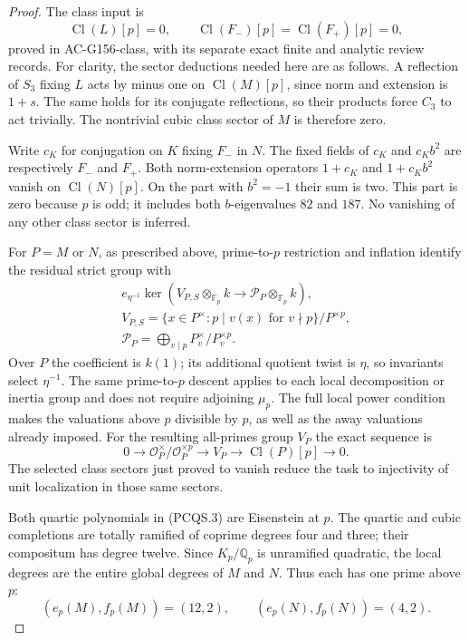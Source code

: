 \begin{proof}
The class input is
\[
 \operatorname{Cl}(L)[p]=0,\qquad
 \operatorname{Cl}(F_-)[p]=\operatorname{Cl}(F_+)[p]=0,
 \tag{PCQS.7}
\]
proved in AC-G156-class, with its separate exact finite and
analytic review records.
For clarity, the sector deductions needed here are as follows.
A reflection of $S_3$ fixing $L$ acts by minus one on
$\operatorname{Cl}(M)[p]$, since norm and extension is $1+s$.
The same holds for its conjugate reflections, so their products
force $C_3$ to act trivially.  The nontrivial cubic class sector
of $M$ is therefore zero.

Write $c_K$ for conjugation on $K$ fixing $F_-$ in $N$.
The fixed fields of $c_K$ and $c_Kb^2$ are respectively
$F_-$ and $F_+$.
Both norm-extension operators $1+c_K$ and $1+c_Kb^2$
vanish on $\operatorname{Cl}(N)[p]$.
On the part with $b^2=-1$ their sum is two.
This part is zero because $p$ is odd; it includes both
$b$-eigenvalues $82$ and $187$.
No vanishing of any other class sector is inferred.

For $P=M$ or $N$, as prescribed above, prime-to-$p$ restriction
and inflation identify the residual strict group with
\[
 \begin{gathered}
 e_{\eta^{-1}}\ker\left(V_{P,S}\otimes_{\mathbb F_p}k
                     \longrightarrow\mathcal P_P\otimes_{\mathbb F_p}k\right),\\
 V_{P,S}=\{x\in P^\times:p\mid v(x)\text{ for }v\nmid p\}/P^{\times p},\\
 \mathcal P_P=\bigoplus_{v\mid p}P_v^\times/P_v^{\times p}.
 \end{gathered}
 \tag{PCQS.8}
\]
Over $P$ the coefficient is $k(1)$; its additional quotient
twist is $\eta$, so invariants select $\eta^{-1}$.
The same prime-to-$p$ descent applies to each local decomposition
or inertia group and does not require adjoining $\mu_p$.
The full local power condition makes the valuations above $p$
divisible by $p$, as well as the away valuations already imposed.
For the resulting all-primes group $V_P$ the exact sequence is
\[
 0\longrightarrow\mathcal O_P^\times/\mathcal O_P^{\times p}
 \longrightarrow V_P\longrightarrow\operatorname{Cl}(P)[p]
 \longrightarrow0.
 \tag{PCQS.9}
\]
The selected class sectors just proved to vanish reduce the task
to injectivity of unit localization in those same sectors.

Both quartic polynomials in (PCQS.3) are Eisenstein at $p$.
The quartic and cubic completions are totally ramified of
coprime degrees four and three; their compositum has degree twelve.
Since $K_p/\mathbb Q_p$ is unramified quadratic, the local degrees
are the entire global degrees of $M$ and $N$.
Thus each has one prime above $p$:
\[
                     (e_p(M),f_p(M))=(12,2),\qquad
                     (e_p(N),f_p(N))=(4,2).
 \tag{PCQS.10}
\]


\end{proof}
